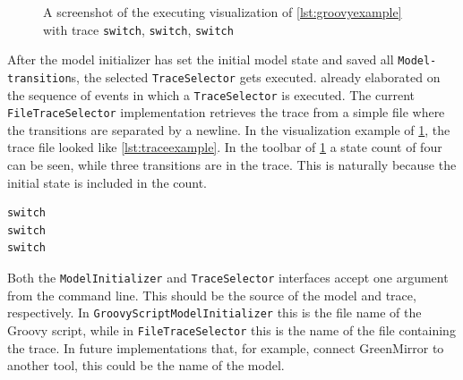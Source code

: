 \documentclass[a4paper]{article}
\begin{document}
\begin{figure}[H]
  \centering
  \caption{A screenshot of the executing visualization of \cref{lst:groovyexample} with trace \lstinline{switch}, \lstinline{switch}, \lstinline{switch}}
  \label{fig:groovyexample}
\end{figure}

After the model initializer has set the initial model state and saved all \lstinline{Model-transition}s, the selected \lstinline{TraceSelector} gets executed.  already elaborated on the sequence of events in which a \lstinline{TraceSelector} is executed. The current \lstinline{FileTraceSelector} implementation retrieves the trace from a simple file where the transitions are separated by a newline. In the visualization example of \cref{fig:groovyexample}, the trace file looked like \cref{lst:traceexample}. In the toolbar of \cref{fig:groovyexample} a state count of four can be seen, while three transitions are in the trace. This is naturally because the initial state is included in the count.	
\begin{lstlisting}[label={lst:traceexample}, caption={Example trace file}]
switch
switch
switch
\end{lstlisting}
Both the \lstinline{ModelInitializer} and \lstinline{TraceSelector} interfaces accept one argument from the command line. This should be the source of the model and trace, respectively. In \lstinline{GroovyScriptModelInitializer} this is the file name of the Groovy script, while in \lstinline{FileTraceSelector} this is the name of the file containing the trace. In future implementations that, for example, connect GreenMirror to another tool, this could be the name of the model.
\end{document}
